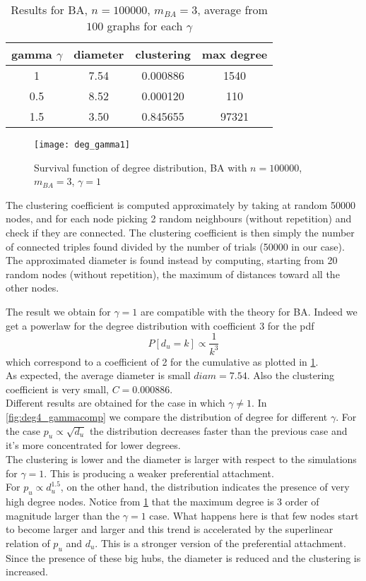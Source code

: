 \begin{table}[ht!]
	\centering
	\begin{tabular}{ |c|c|c|c| } 
		\hline
		gamma $\gamma$ & diameter &  clustering & max degree\\
		\hline
		1 & 7.54 & 0.000886 & 1540\\
		0.5 & 8.52 & 0.000120 & 110\\
		1.5 & 3.50 & 0.845655 & 97321\\
		\hline
	\end{tabular}
	\caption{Results for BA, $n=100000$,  $m_{BA}=3$, average from $100$ graphs for each $\gamma$}
	\label{t:res4}
\end{table}
\begin{figure} [!ht]
	\centering
	\texttt{[image: deg\_gamma1]}
	\caption{Survival function of degree distribution, BA with $n=100000$,  $m_{BA}=3$, $\gamma=1$}
	\label{fig:deg4_gamma1}
\end{figure}

The clustering coefficient is computed approximately by taking at random 50000 nodes, and for each node picking 2 random neighbours (without repetition) and check if they are connected. The clustering coefficient is then simply the number of connected triples found divided by the number of trials (50000 in our case).
The approximated diameter is found instead by computing, starting from 20 random nodes (without repetition), the maximum of distances toward all the other nodes.

\pagebreak

The result we obtain for $\gamma=1$ are compatible with the theory for BA. Indeed we get a powerlaw for the degree distribution with coefficient 3 for the pdf
\begin{equation}
P[d_u=k] \propto \frac{1}{k^3}
\end{equation}
which correspond to a coefficient of 2 for the cumulative as plotted in \cref{fig:deg4_gamma1}. \\As expected, the average diameter is small $diam=7.54$. Also the clustering coefficient is very small, $C= 0.000886$.\\

Different results are obtained for the case in which $\gamma \neq 1$. In \cref{fig:deg4_gammacomp} we compare the distribution of degree for different $\gamma$. For the case $p_u \propto \sqrt{d_u}$ the distribution decreases faster than the previous case and it's more concentrated for lower degrees.\\
The clustering is lower and the diameter is larger with respect to the simulations for $\gamma=1$. This is producing a weaker preferential attachment.\\
For $p_u \propto d_u^{1.5}$, on the other hand, the distribution indicates the presence of very high degree nodes. Notice from \cref{t:res4} that the maximum degree is 3 order of magnitude larger than the $\gamma=1$ case. 
What happens here is that few nodes start to become larger and larger and this trend is accelerated by the superlinear relation of $p_u$ and $d_u$. This is a stronger version of the preferential attachment.
Since the presence of these big hubs, the diameter is reduced and the clustering is increased.

